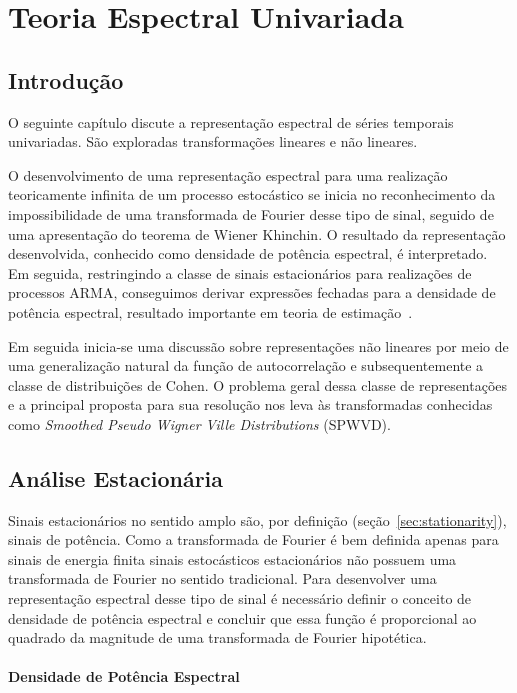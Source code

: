 \chapter{Teoria Espectral Univariada}\label{chap:spectral_analysis}

\section*{Introdução}

O seguinte capítulo discute a representação espectral de séries temporais
univariadas. São exploradas transformações lineares e não lineares.

O desenvolvimento de uma representação espectral para uma realização
teoricamente infinita de um processo estocástico se inicia no reconhecimento da
impossibilidade de uma transformada de Fourier desse tipo de sinal, seguido de
uma apresentação do teorema de Wiener Khinchin. O resultado da representação
desenvolvida, conhecido como densidade de potência espectral, é interpretado.
Em seguida, restringindo a classe de sinais estacionários para realizações de
processos ARMA, conseguimos derivar expressões fechadas para a densidade
de potência espectral, resultado importante em teoria de
estimação~\cite{porat}.

Em seguida inicia-se uma discussão sobre representações não lineares por meio
de uma generalização natural da função de autocorrelação e subsequentemente a
classe de distribuições de Cohen. O problema geral dessa classe de
representações e a principal proposta para sua resolução nos leva às
transformadas conhecidas como \emph{Smoothed Pseudo Wigner Ville
Distributions} (SPWVD).

\section{Análise Estacionária}

Sinais estacionários no sentido amplo são, por definição
(seção~\ref{sec:stationarity}), sinais de potência. Como a transformada de
Fourier é bem definida apenas para sinais de energia finita sinais estocásticos
estacionários não possuem uma transformada de Fourier no sentido tradicional.
Para desenvolver uma representação espectral desse tipo de sinal é necessário
definir o conceito de densidade de potência espectral e concluir que essa
função é proporcional ao quadrado da magnitude de uma transformada de Fourier
hipotética.

\subsubsection{Densidade de Potência Espectral}

